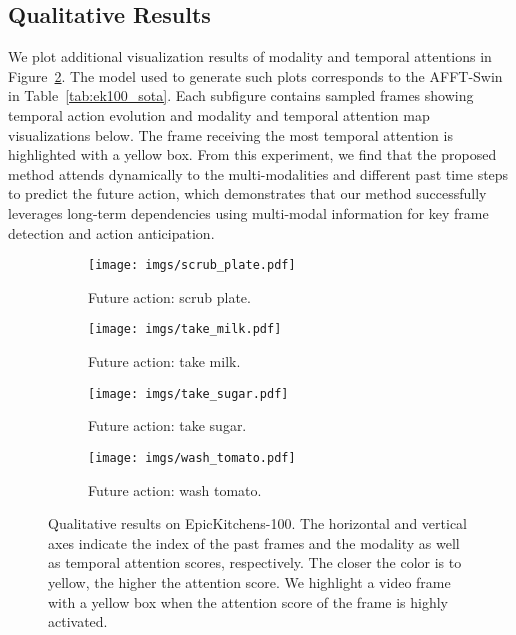 \documentclass[10pt,twocolumn,letterpaper,dvipsnames]{article}
\newcommand{\sname}{AFFT}
\begin{document}
\subsection{Qualitative Results}
\label{subsec:qualitative}
We plot additional visualization results of modality and temporal attentions in Figure~\ref{fig:qualitative}. The model used to generate such plots corresponds to the \sname-Swin in Table~\ref{tab:ek100_sota}. Each subfigure contains sampled frames showing temporal action evolution and modality and temporal attention map visualizations below. The frame receiving the most temporal attention is highlighted with a yellow box. From this experiment, we find that the proposed method attends dynamically to the multi-modalities and different past time steps to predict the future action, which demonstrates that our method successfully leverages long-term dependencies using multi-modal information for key frame detection and action anticipation.

\begin{figure}[t]
   \centering
     \begin{subfigure}[b]{\linewidth}
         \centering
         \texttt{[image: imgs/scrub\_plate.pdf]}
         \caption{Future action: scrub plate.}
         \label{fig:sub_qualitative_plate}
     \end{subfigure}
     \begin{subfigure}[b]{\linewidth}
         \centering
         \texttt{[image: imgs/take\_milk.pdf]}
         \caption{Future action: take milk.}
     \end{subfigure}
     \begin{subfigure}[b]{\linewidth}
         \centering
         \texttt{[image: imgs/take\_sugar.pdf]}
         \caption{Future action: take sugar.}
     \end{subfigure}
     \begin{subfigure}[b]{\linewidth}
         \centering
         \texttt{[image: imgs/wash\_tomato.pdf]}
         \caption{Future action: wash tomato.}
     \end{subfigure}
     \caption{Qualitative results on EpicKitchens-100. The horizontal and vertical axes indicate the index of the past frames and the modality as well as temporal attention scores, respectively. The closer the color is to yellow, the higher the attention score. We highlight a video frame with a yellow box when the attention score of the frame is highly activated.}
     \label{fig:qualitative}
\end{figure}
\end{document}
